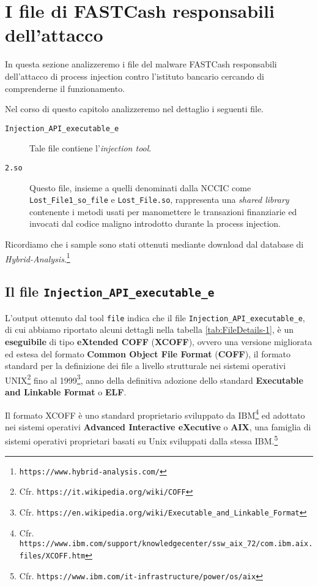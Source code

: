 \documentclass[10pt,a4paper, titlepage]{report}
\begin{document}
\newpage
\section{I file di FASTCash responsabili dell'attacco}

In questa sezione analizzeremo i file del malware FASTCash responsabili dell'attacco di process injection contro l'istituto bancario cercando di comprenderne il funzionamento. 

Nel corso di questo capitolo analizzeremo nel dettaglio i seguenti file.

\begin{description}
\item[\texttt{Injection\_API\_executable\_e}] Tale file contiene l'\textit{injection tool}.
\item[\texttt{2.so}] Questo file, insieme a quelli denominati dalla NCCIC come \texttt{Lost\_File1\_\-so\-\_file} e \texttt{Lost\_File.so}, rappresenta una \textit{shared library} contenente i metodi usati per manomettere le transazioni finanziarie ed invocati dal codice maligno introdotto durante la process injection.
\end{description}

Ricordiamo che i sample sono stati ottenuti mediante download dal database di \textit{Hybrid-Analysis}.\footnote{\texttt{https://www.hybrid-analysis.com/}}

\subsection{Il file \texttt{Injection\_API\_executable\_e}}\label{sec:InjectionAPIExecutableE}

L'output ottenuto dal tool \texttt{file} indica che il file \texttt{Injection\_API\_executable\_e}, di cui abbiamo riportato alcuni dettagli nella tabella \ref{tab:FileDetails-1}, è un \textbf{eseguibile} di tipo \textbf{eXtended COFF} (\textbf{XCOFF}), ovvero una versione migliorata ed estesa del formato \textbf{Common Object File Format} (\textbf{COFF}), il formato standard per la definizione dei file a livello strutturale nei sistemi operativi UNIX\footnote{Cfr. \texttt{https://it.wikipedia.org/wiki/COFF}} fino al 1999\footnote{Cfr. \texttt{https://en.wikipedia.org/wiki/Executable\_and\_Linkable\_Format}}, anno della definitiva adozione dello standard \textbf{Executable and Linkable Format} o \textbf{ELF}.

Il formato XCOFF è uno standard proprietario sviluppato da IBM\footnote{Cfr. \texttt{https://www.ibm.com/support/knowledgecenter/ssw\_aix\_72/com.ibm.aix.files/XCOFF.htm}} ed adottato nei sistemi operativi \textbf{Advanced Interactive eXecutive} o \textbf{AIX}, una famiglia di sistemi operativi proprietari basati su Unix sviluppati dalla stessa IBM.\footnote{Cfr. \texttt{https://www.ibm.com/it-infrastructure/power/os/aix}}
\end{document}
